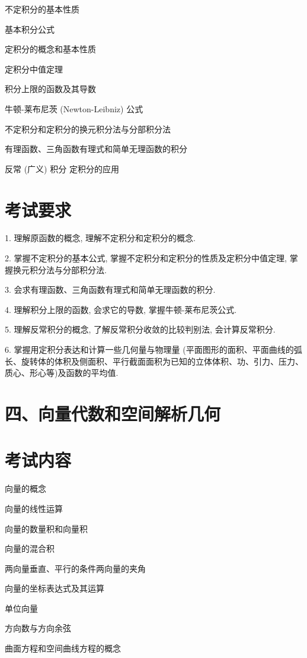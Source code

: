 \documentclass[10pt]{article}
\begin{document}
不定积分的基本性质 

基本积分公式 

定积分的概念和基本性质 

定积分中值定理 

积分上限的函数及其导数 

牛顿-莱布尼茨 (Newton-Leibniz) 公式 

不定积分和定积分的换元积分法与分部积分法 

有理函数、三角函数有理式和简单无理函数的积分 

反常 (广义) 积分 定积分的应用

\section*{考试要求}

1. 理解原函数的概念, 理解不定积分和定积分的概念.

2. 掌握不定积分的基本公式, 掌握不定积分和定积分的性质及定积分中值定理, 掌握换元积分法与分部积分法.

3. 会求有理函数、三角函数有理式和简单无理函数的积分.

4. 理解积分上限的函数, 会求它的导数, 掌握牛顿-莱布尼茨公式.

5. 理解反常积分的概念, 了解反常积分收敛的比较判别法, 会计算反常积分.

6. 掌握用定积分表达和计算一些几何量与物理量 (平面图形的面积、平面曲线的弧长、旋转体的体积及侧面积、平行截面面积为已知的立体体积、功、引力、压力、质心、形心等)及函数的平均值.

\section*{四、向量代数和空间解析几何}

\section*{考试内容}

向量的概念 

向量的线性运算 

向量的数量积和向量积 

向量的混合积 

两向量垂直、平行的条件两向量的夹角 

向量的坐标表达式及其运算 

单位向量 

方向数与方向余弦 

曲面方程和空间曲线方程的概念 
\end{document}
